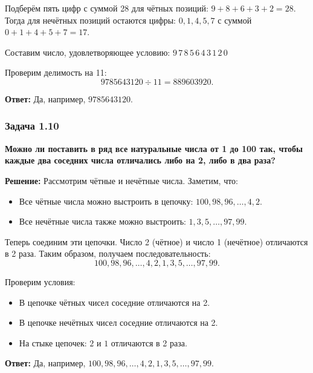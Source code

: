 \documentclass[12pt, a4paper]{article}
\begin{document}
Подберём пять цифр с суммой 28 для чётных позиций: $9 + 8 + 6 + 3 + 2 = 28$. Тогда для нечётных позиций остаются цифры: $0, 1, 4, 5, 7$ с суммой $0+1+4+5+7=17$.

Составим число, удовлетворяющее условию: $9\,7\,8\,5\,6\,4\,3\,1\,2\,0$ 

Проверим делимость на 11:
\[
9785643120 \div 11 = 889603920.
\]

\textbf{Ответ:} Да, например, $9785643120$.

\subsubsection*{Задача 1.10}
\textbf{Можно ли поставить в ряд все натуральные числа от 1 до 100 так, чтобы каждые два соседних числа отличались либо на 2, либо в два раза?}

\textbf{Решение:}
Рассмотрим чётные и нечётные числа. Заметим, что:
\begin{itemize}
    \item Все чётные числа можно выстроить в цепочку: $100, 98, 96, \ldots, 4, 2$.
    \item Все нечётные числа также можно выстроить: $1, 3, 5, \ldots, 97, 99$.
\end{itemize}

Теперь соединим эти цепочки. Число 2 (чётное) и число 1 (нечётное) отличаются в 2 раза. Таким образом, получаем последовательность:
\[
100, 98, 96, \ldots, 4, 2, 1, 3, 5, \ldots, 97, 99.
\]

Проверим условия:
\begin{itemize}
    \item В цепочке чётных чисел соседние отличаются на 2.
    \item В цепочке нечётных чисел соседние отличаются на 2.
    \item На стыке цепочек: $2$ и $1$ отличаются в 2 раза.
\end{itemize}

\textbf{Ответ:} Да, например, $100, 98, 96, \ldots, 4, 2, 1, 3, 5, \ldots, 97, 99$.
\end{document}
